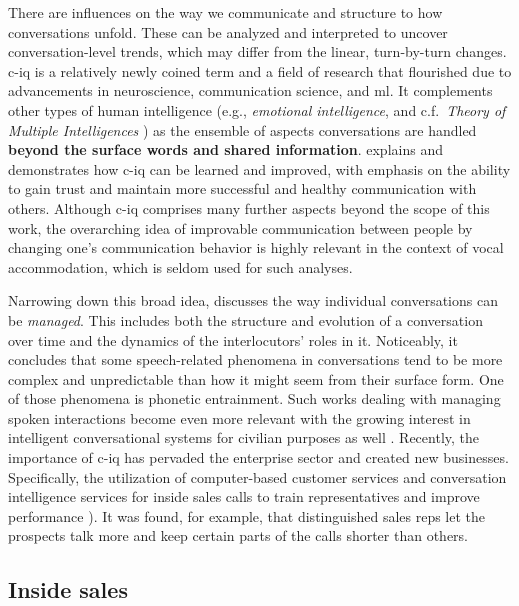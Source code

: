 There are influences on the way we communicate and structure to how conversations unfold.
These can be analyzed and interpreted to uncover conversation-level trends, which may differ from the linear, turn-by-turn changes.
\Acf{c-iq} is a relatively newly coined term and a field of research that flourished due to advancements in neuroscience, communication science, and \ac{ml}.
It complements other types of human intelligence (e.g., \emph{emotional intelligence}, and c.f.\ \emph{Theory of Multiple Intelligences} \citep{Gardner1983frames, Davis2011theory}) as the ensemble of aspects conversations are handled \textbf{beyond the surface words and shared information}.
\citet{Glaser2016conversational} explains and demonstrates how \ac{c-iq} can be learned and improved, with emphasis on the ability to gain trust and maintain more successful and healthy communication with others.
Although \ac{c-iq} comprises many further aspects beyond the scope of this work, the overarching idea of improvable communication between people by changing one's communication behavior is highly relevant in the context of vocal accommodation, which is seldom used for such analyses.

Narrowing down this broad idea, \citet{SilberVarod2018human} discusses the way individual conversations can be \emph{managed}.
This includes both the structure and evolution of a conversation over time and the dynamics of the interlocutors' roles in it.
Noticeably, it concludes that some speech-related phenomena in conversations tend to be more complex and unpredictable than how it might seem from their surface form.
One of those phenomena is phonetic entrainment.
Such works dealing with managing spoken interactions become even more relevant with the growing interest in intelligent conversational systems for civilian purposes as well \citep{Mehr2017artificial}.
Recently, the importance of \ac{c-iq} has pervaded the enterprise sector and created new businesses.
Specifically, the utilization of computer-based customer services \citep{Gnewuch2017towards} and conversation intelligence services for inside sales calls to train representatives and improve performance \citep{Orlob2017winning,Orlob2017separates}).
It was found, for example, that distinguished sales reps let the prospects talk more and keep certain parts of the calls shorter than others.

\subsection{Inside sales}
\label{subsec:inside_sales}

